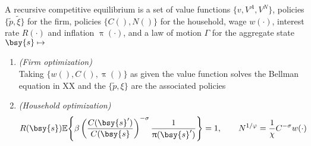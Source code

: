 \documentclass[a4paper,10pt]{article}  %
\begin{document}
\newpage
\begin{equil} \small
A recursive competitive equilibrium is a set of value functions $ \Big\{ v, V^A, V^{N} \Big\} $, policies $ \big\{
\tilde{p}, \tilde{\xi} \big\} $ for the firm, policies $ \Big\{ C( ), N( ) \Big\} $ for the household, wage $
w(\cdot) $, interest rate $ R(\cdot) $ and inflation $ \uppi(\cdot) $, and a law of motion $\Gamma$ for the aggregate
state $ \bsy{s} \mapsto $
\begin{enumerate}
   
   \item \emph{(Firm optimization)} \\
   Taking $ \big\{ w(),C(),\uppi() \big\}$ as given the value function solves the Bellman equation in XX and
   the $ \{ \tilde{p}, \xi \} $ are the associated policies

   \item \emph{(Household optimization)} \\
   \[
      R(\bsy{s} )  \mathbb{E} \Bigg\{\beta \left( \frac{C(\bsy{s}')}{C(\bsy{s}} \right)^{-\sigma} \frac{ 1 }{ \uppi(\bsy{s}') } \Bigg\} = 1 , 
      \qquad
      N^{1/\varphi} = \frac{1}{\chi} C^{-\sigma}  w( \cdot )
   \]


\end{enumerate}
\end{equil}
\end{document}
